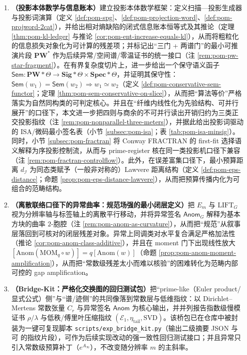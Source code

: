 \begin{enumerate}
  \item \textbf{（投影本体数学与信息账本）}建立投影本体数学框架：定义扫描—投影生成器与投影词演算（定义 \ref{def:pom-spg}、\ref{def:pom-projection-word}、\ref{def:pom-projword-2cat}），并给出相对熵缺陷的闭式信息账本恒等式及其推论（定理 \ref{thm:pom-kl-ledger} 与推论 \ref{cor:pom-ent-increase-equals-kl}），从而将粗粒化的信息损失对象化为可计算的残差项；并标记出“三门 + 两谱门”的最小可推演片段 \(\mathbf{PW}^{\ast}\) 作为后续异常/空间谱/零温证书的统一接口（注 \ref{rem:pom-pw-star-fragment}）。在有界复杂度切片上，进一步给出一个保守语义函子 \(\mathsf{Sem}:\mathbf{PW}*\Theta\to \mathbf{Sig}*\Theta\times \mathbf{Spec}*\Theta\)，并证明其保守性：\(\mathsf{Sem}(w_1)=\mathsf{Sem}(w_2)\Rightarrow w_1\simeq w_2\)（定义 \ref{def:pom-conservative-sem-functor}；定理 \ref{thm:pom-sem-conservative-on-slice}），从而把“算法等价”严格落实为自然同构类的可判定核心。并且在“纤维内线性化为先验结构、可并行展开”的口径下，本文进一步把四则与商余的不可并行读出开销归约为三类正交投影指纹（注 \ref{rem:pom-nonparallel-three-meters}），并据此给出投影词驱动的 ISA/微码最小签名表（小节 \ref{subsec:pom-isa}；表 \ref{tab:pom-isa-minsig}）。同时，小节 \ref{subsec:pom-fractran} 将 Conway FRACTRAN 的 first-fit 选择语义解释为序投影控制流，从而与 prime-register 核在同一类投影机口径下兼容（注 \ref{rem:pom-fractran-controlflow}）。此外，在误差富集口径下，最小预算距离 \(d_{\mathcal I}\) 为同态类赋予（一般非对称的）Lawvere 距离结构（定义 \ref{def:pom-eps-distance}；命题 \ref{prop:pom-eps-distance-lawvere}），从而把预算传播内化为可组合的范畴结构。
  \item \textbf{（离散联络口径下的异常曲率：规范场强的最小闭层定义）}把 \(E_m\) 与 \(\mathrm{LIFT}_G\) 视为分辨率轴与标签轴上的离散平行移动，并将异常签名 \(\mathsf{Anom}_G\) 解释为基本方块的曲率 \(2\)-胞腔（注 \ref{rem:pom-anom-as-curvature}），从而把“规范”从叙事层落回到可核对的闭层残差对象。异常上同调类对水平复合满足严格加法性（推论 \ref{cor:pom-anom-class-additive}），并且在 moment 门下出现线性放大 \( [\mathrm{Anom}(\mathrm{MOM}_q\circ w)]=q[\mathrm{Anom}(w)] \)（命题 \ref{prop:pom-anom-moment-amplification}），从而把“常数级残差太小而难以核验”的困难转化为范畴内部可控的 gap amplification。
  \item \textbf{（Bridge-Kit：严格化交换图的回归测试包）}把“prime-like（Euler product/显式公式）侧”与“谱/迹侧”的共同像落到常数层与低维指纹：以 Dirichlet--Mertens 常数张量 \(C_r\) 与异常签名 \(\mathsf{Anom}\) 为核心输出，并并列报告指数级慢模证书 \(\rho/\lambda\) 与低秩/傅里叶压缩指纹 \((\mathcal{E}_1,\eta_{\mathrm{tail}},\text{SVD})\)。该桥包已在仓库中被封装为一键可复现脚本 \texttt{scripts/exp\_bridge\_kit.py}（输出二级摘要 JSON 与可 \verb|| 的指纹片段），可作为后续实现改动的强一致性回归测试接口；并且异常只引入常数级预算补丁（\(e^{A_\infty}\)），不改变随分辨率 \(m\) 的主斜率。

\end{enumerate}

